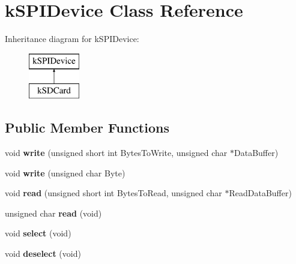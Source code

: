 \hypertarget{classkSPIDevice}{}\section{k\+S\+P\+I\+Device Class Reference}
\label{classkSPIDevice}
Inheritance diagram for k\+S\+P\+I\+Device\+:\begin{figure}[H]
\begin{center}
\leavevmode
\includegraphics[height=2.000000cm]{classkSPIDevice}
\end{center}
\end{figure}
\subsection*{Public Member Functions}
\begin{DoxyCompactItemize}
\item 
void {\bfseries write} (unsigned short int Bytes\+To\+Write, unsigned char $\ast$Data\+Buffer)\hypertarget{classkSPIDevice_afed454ddc1a7563ac3e2b2c81e2f30cf}{}\label{classkSPIDevice_afed454ddc1a7563ac3e2b2c81e2f30cf}

\item 
void {\bfseries write} (unsigned char Byte)\hypertarget{classkSPIDevice_a5d91795858db810e3cb6240e7d3ab6c2}{}\label{classkSPIDevice_a5d91795858db810e3cb6240e7d3ab6c2}

\item 
void {\bfseries read} (unsigned short int Bytes\+To\+Read, unsigned char $\ast$Read\+Data\+Buffer)\hypertarget{classkSPIDevice_a6198701733aa49a62197e8e352b91612}{}\label{classkSPIDevice_a6198701733aa49a62197e8e352b91612}

\item 
unsigned char {\bfseries read} (void)\hypertarget{classkSPIDevice_adae1ee49e21ed5e671488855b9156357}{}\label{classkSPIDevice_adae1ee49e21ed5e671488855b9156357}

\item 
void {\bfseries select} (void)\hypertarget{classkSPIDevice_a5fd0c88a3ea09d019cb2f5f187b05a6d}{}\label{classkSPIDevice_a5fd0c88a3ea09d019cb2f5f187b05a6d}

\item 
void {\bfseries deselect} (void)\hypertarget{classkSPIDevice_a50490cb2c1563b5c7f2ec2c52d30b2fd}{}\label{classkSPIDevice_a50490cb2c1563b5c7f2ec2c52d30b2fd}

\end{DoxyCompactItemize}

